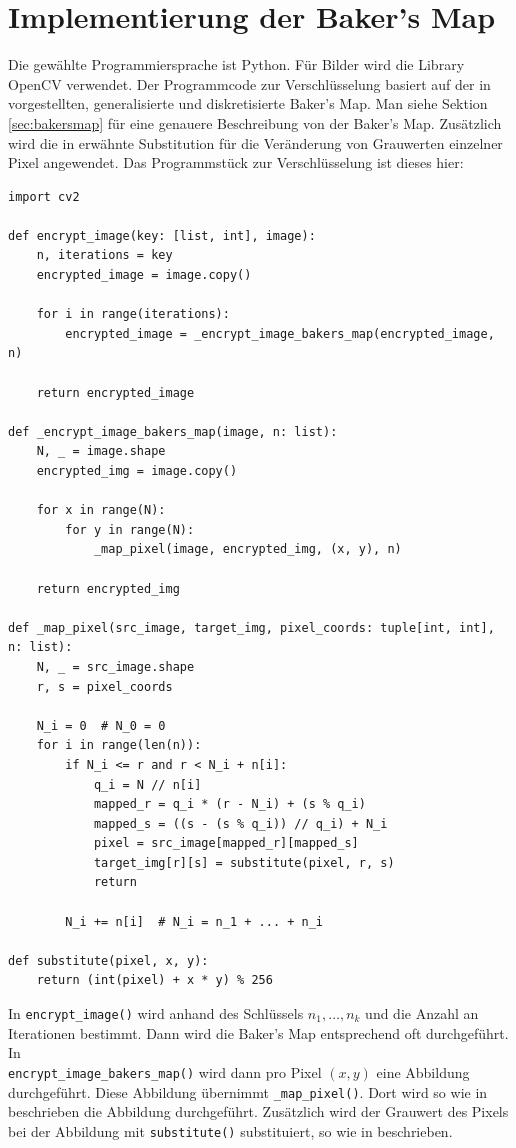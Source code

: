 
\usepackage[naustrian]{babel}


\maketitle

\section{Implementierung der Baker's Map}
Die gewählte Programmiersprache ist Python.
Für Bilder wird die Library OpenCV verwendet. Der Programmcode zur Verschlüsselung basiert auf der in
\cite{fridrich97} vorgestellten, generalisierte und diskretisierte Baker's Map. Man siehe Sektion
\ref{sec:bakersmap} für eine genauere Beschreibung von der Baker's Map. Zusätzlich wird die in \cite{chaos}
erwähnte Substitution für die Veränderung von Grauwerten einzelner Pixel angewendet. Das Programmstück
zur Verschlüsselung ist dieses hier:
\begin{lstlisting}
import cv2

def encrypt_image(key: [list, int], image):
    n, iterations = key
    encrypted_image = image.copy()

    for i in range(iterations):
        encrypted_image = _encrypt_image_bakers_map(encrypted_image, n)

    return encrypted_image

def _encrypt_image_bakers_map(image, n: list):
    N, _ = image.shape
    encrypted_img = image.copy()

    for x in range(N):
        for y in range(N):
            _map_pixel(image, encrypted_img, (x, y), n)

    return encrypted_img

def _map_pixel(src_image, target_img, pixel_coords: tuple[int, int], n: list):
    N, _ = src_image.shape
    r, s = pixel_coords

    N_i = 0  # N_0 = 0
    for i in range(len(n)):
        if N_i <= r and r < N_i + n[i]:
            q_i = N // n[i]
            mapped_r = q_i * (r - N_i) + (s % q_i)
            mapped_s = ((s - (s % q_i)) // q_i) + N_i
            pixel = src_image[mapped_r][mapped_s]
            target_img[r][s] = substitute(pixel, r, s)
            return

        N_i += n[i]  # N_i = n_1 + ... + n_i

def substitute(pixel, x, y):
    return (int(pixel) + x * y) % 256
\end{lstlisting}
In \lstinline{encrypt_image()} wird anhand des Schlüssels $n_1, \dots, n_k$ und die Anzahl an Iterationen bestimmt.
Dann wird die Baker's Map entsprechend oft durchgeführt. In \\\lstinline{encrypt_image_bakers_map()} wird dann
pro Pixel $(x, y)$ eine Abbildung durchgeführt. Diese Abbildung übernimmt \lstinline{_map_pixel()}. Dort
wird so wie in \cite{fridrich97} beschrieben die Abbildung durchgeführt. Zusätzlich wird der Grauwert des Pixels bei
der Abbildung mit \lstinline{substitute()} substituiert, so wie in \cite{chaos} beschrieben.

